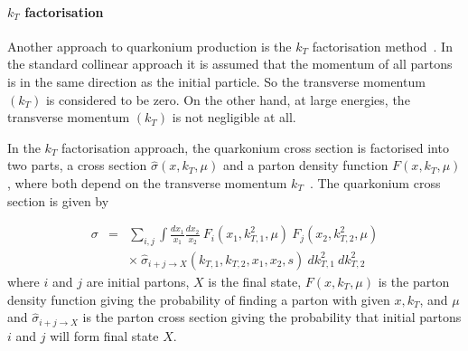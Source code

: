 \paragraph{$k_T$ factorisation}

 Another approach to quarkonium production is the $k_T$ factorisation method~\cite{kt1,kt2}. In the 
 standard collinear approach it is assumed that the momentum of all partons is in the same direction as the
initial particle. So the  transverse momentum $(k_T)$ is considered to be zero. On the other hand,  
 at large energies,  the transverse momentum $(k_T)$ is not negligible at all. 
 
 
In the $k_T$ factorisation approach, the quarkonium cross section is factorised into two parts, 
 a cross section ${\hat \sigma} (x, k_T, \mu)$ and a parton density function $F(x, k_T, \mu)$, where both depend on the transverse momentum
$k_T$~\cite{kt3}.  The quarkonium cross section is given by 
 
 \begin{eqnarray}
 \sigma &=& \sum_{i,j} \int \frac {dx_1}{x_1} \frac {dx_2}{x_2} \ F_i (x_1, k_{T,1}^2, \mu) \  F_j (x_2, k_{T,2}^2, \mu) \nonumber \\
&& \times \ {\hat \sigma}_{i+j \rightarrow X} (k_{T,1},k_{T,2},x_1,x_2,s) \ dk^2_{T,1} \ dk^2_{T,2}
 \end{eqnarray}
 where $i$ and $j$ are initial partons, $X$ is the final state, $F(x, k_T, \mu)$ is the parton density
function giving the probability of finding a parton with given $x, k_T$, and $\mu$ and ${\hat \sigma}_{i+j \rightarrow X}$ 
is the parton cross section giving the probability that initial partons $i$ and $j$ will form
final state $X$.
